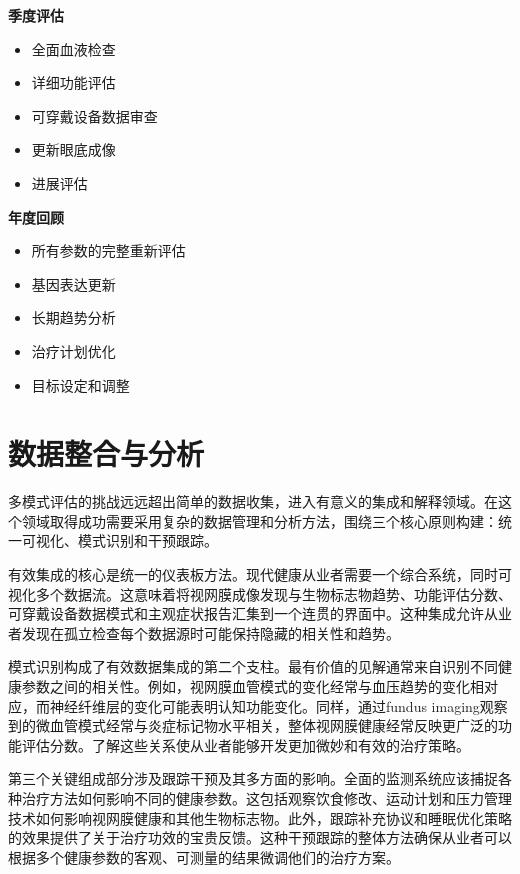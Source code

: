 \documentclass[
  Letterpaper,
]{scrbook}
\providecommand{\tightlist}{%
  \setlength{\itemsep}{0pt}\setlength{\parskip}{0pt}}\usepackage{longtable,booktabs,array}
\begin{document}
\textbf{季度评估}

\begin{itemize}
\tightlist
\item
  全面血液检查
\item
  详细功能评估
\item
  可穿戴设备数据审查
\item
  更新眼底成像
\item
  进展评估
\end{itemize}

\textbf{年度回顾}

\begin{itemize}
\tightlist
\item
  所有参数的完整重新评估
\item
  基因表达更新
\item
  长期趋势分析
\item
  治疗计划优化
\item
  目标设定和调整
\end{itemize}

\section{数据整合与分析}\label{ux6570ux636eux6574ux5408ux4e0eux5206ux6790}

多模式评估的挑战远远超出简单的数据收集，进入有意义的集成和解释领域。在这个领域取得成功需要采用复杂的数据管理和分析方法，围绕三个核心原则构建：统一可视化、模式识别和干预跟踪。

有效集成的核心是统一的仪表板方法。现代健康从业者需要一个综合系统，同时可视化多个数据流。这意味着将视网膜成像发现与生物标志物趋势、功能评估分数、可穿戴设备数据模式和主观症状报告汇集到一个连贯的界面中。这种集成允许从业者发现在孤立检查每个数据源时可能保持隐藏的相关性和趋势。

模式识别构成了有效数据集成的第二个支柱。最有价值的见解通常来自识别不同健康参数之间的相关性。例如，视网膜血管模式的变化经常与血压趋势的变化相对应，而神经纤维层的变化可能表明认知功能变化。同样，通过fundus
imaging观察到的微血管模式经常与炎症标记物水平相关，整体视网膜健康经常反映更广泛的功能评估分数。了解这些关系使从业者能够开发更加微妙和有效的治疗策略。

第三个关键组成部分涉及跟踪干预及其多方面的影响。全面的监测系统应该捕捉各种治疗方法如何影响不同的健康参数。这包括观察饮食修改、运动计划和压力管理技术如何影响视网膜健康和其他生物标志物。此外，跟踪补充协议和睡眠优化策略的效果提供了关于治疗功效的宝贵反馈。这种干预跟踪的整体方法确保从业者可以根据多个健康参数的客观、可测量的结果微调他们的治疗方案。
\end{document}
